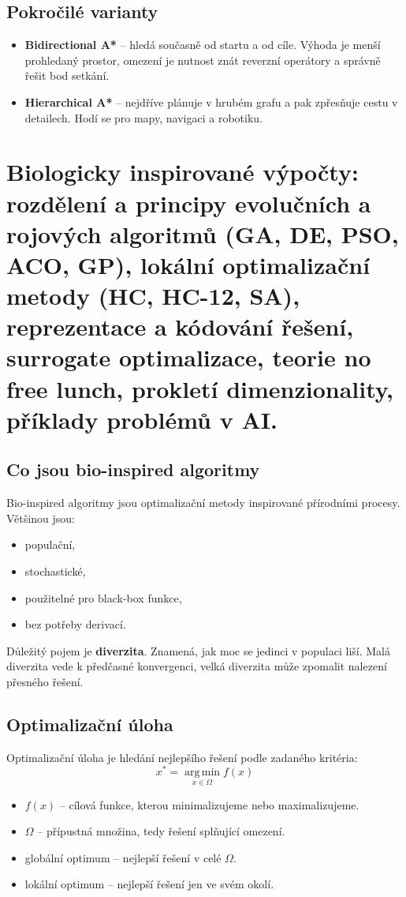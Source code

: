 \subsection*{Pokročilé varianty}
\begin{itemize}
    \item \textbf{Bidirectional A*} -- hledá současně od startu a od cíle. Výhoda je menší prohledaný prostor, omezení je nutnost znát reverzní operátory a správně řešit bod setkání.
    \item \textbf{Hierarchical A*} -- nejdříve plánuje v hrubém grafu a pak zpřesňuje cestu v detailech. Hodí se pro mapy, navigaci a robotiku.
\end{itemize}

\section{Biologicky inspirované výpočty: rozdělení a principy evolučních a rojových algoritmů (GA, DE, PSO, ACO, GP), lokální optimalizační metody (HC, HC-12, SA), reprezentace a kódování řešení, surrogate optimalizace, teorie no free lunch, prokletí dimenzionality, příklady problémů v AI.}

\subsection*{Co jsou bio-inspired algoritmy}
Bio-inspired algoritmy jsou optimalizační metody inspirované přírodními
procesy. Většinou jsou:
\begin{itemize}
    \item populační,
    \item stochastické,
    \item použitelné pro black-box funkce,
    \item bez potřeby derivací.
\end{itemize}

Důležitý pojem je \textbf{diverzita}. Znamená, jak moc se jedinci v populaci
liší. Malá diverzita vede k předčasné konvergenci, velká diverzita může
zpomalit nalezení přesného řešení.

\subsection*{Optimalizační úloha}
Optimalizační úloha je hledání nejlepšího řešení podle zadaného kritéria:
\begin{equation}
    x^* = \operatorname*{arg\,min}_{x \in \Omega} f(x)
\end{equation}
\begin{itemize}
    \item \(f(x)\) -- cílová funkce, kterou minimalizujeme nebo maximalizujeme.
    \item \(\Omega\) -- přípustná množina, tedy řešení splňující omezení.
    \item globální optimum -- nejlepší řešení v celé \(\Omega\).
    \item lokální optimum -- nejlepší řešení jen ve svém okolí.
\end{itemize}


